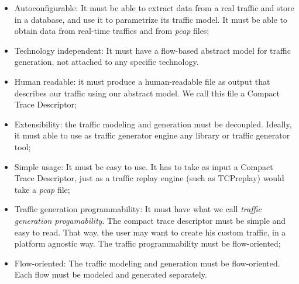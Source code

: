 \begin{itemize}
	
	\item Autoconfigurable: It must be able to extract data from a real traffic and store in a database, and use it to parametrize its traffic model. It must be able to obtain data from real-time traffics and from \textit{pcap} files;
	
	\item Technology independent: It must have a flow-based abstract model for traffic generation, not attached to any specific technology.
	
	\item Human readable: it must produce a human-readable file as output that describes our traffic using our abstract model. We call this file a Compact Trace Descriptor;
	
	\item Extensibility: the traffic modeling and generation must be decoupled. Ideally, it must able to use as traffic generator engine any library or traffic generator tool;
	
	\item Simple usage: It must be easy to use. It has to take as input a Compact Trace Descriptor, just as a traffic replay engine (such as TCPreplay) would take a \textit{pcap} file;
	
	\item Traffic generation programmability: It must have what we call \textit{traffic generation progamability}. The compact trace descriptor must be simple and easy to read. That way, the user may want to create his custom traffic, in a platform agnostic way. The traffic programmability must be flow-oriented;
	
	\item Flow-oriented: The traffic modeling and generation must be flow-oriented. Each flow must be modeled and generated separately.
	
\end{itemize}









